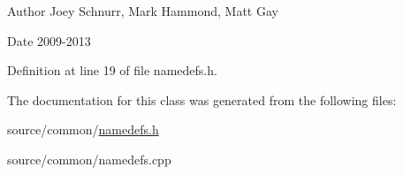\begin{DoxyAuthor}{Author}
Joey Schnurr, Mark Hammond, Matt Gay 
\end{DoxyAuthor}
\begin{DoxyDate}{Date}
2009-\/2013 
\end{DoxyDate}


Definition at line 19 of file namedefs.\-h.



The documentation for this class was generated from the following files\-:\begin{DoxyCompactItemize}
\item 
source/common/\hyperlink{namedefs_8h}{namedefs.\-h}\item 
source/common/namedefs.\-cpp\end{DoxyCompactItemize}
